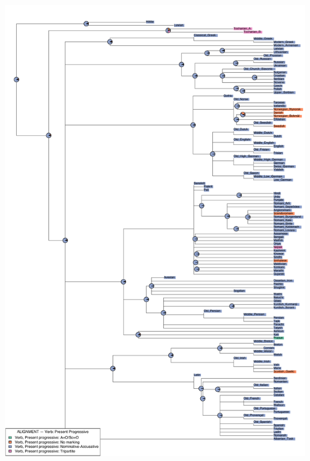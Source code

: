\includegraphics[width=.9\linewidth]{supp-graphics/ALIGNMENTVerbPresentProgressiveVPROGOSoALIGNMENTVerbPresentProgressiveVPROGAOALIGNMENTVerbPresentProgressiveVPROGASaALIGNMENTVerbPresentProgressiveVPROGSaSo.pdf}

